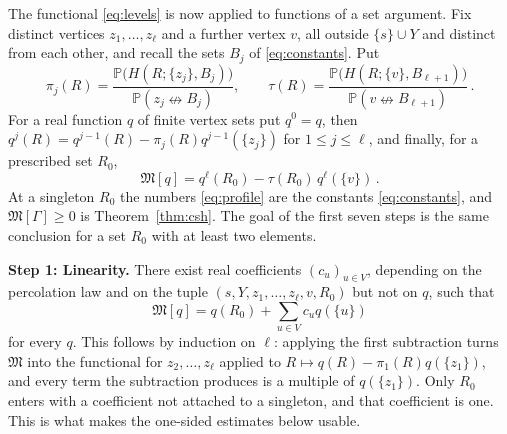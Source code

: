 \documentclass[11pt]{article}
\theoremstyle{definition}
\theoremstyle{remark}
\newcommand{\PP}{\mathbb P}
\newcommand{\ncon}{\nleftrightarrow}
\newcommand{\Marg}{\mathfrak M}
\begin{document}
The functional \eqref{eq:levels} is now applied to functions of a set argument. Fix
distinct vertices $z_1,\dots,z_\ell$ and a further vertex $v$, all outside $\{s\}\cup Y$
and distinct from each other, and recall the sets $B_j$ of \eqref{eq:constants}. Put
\begin{equation}\label{eq:profile}
 \pi_j(R)=\frac{\PP\bigl(H(R;\{z_j\},B_j)\bigr)}{\PP(z_j\ncon B_j)},\qquad
 \tau(R)=\frac{\PP\bigl(H(R;\{v\},B_{\ell+1})\bigr)}{\PP(v\ncon B_{\ell+1})}\,.
\end{equation}
For a real function $q$ of finite vertex sets put $q^0=q$, then
$q^j(R)=q^{j-1}(R)-\pi_j(R)q^{j-1}(\{z_j\})$ for $1\leq j\leq\ell$, and finally, for a
prescribed set $R_0$,
\begin{equation}\label{eq:margin}
 \Marg[q]=q^\ell(R_0)-\tau(R_0)\,q^\ell(\{v\})\,.
\end{equation}
At a singleton $R_0$ the numbers \eqref{eq:profile} are the constants
\eqref{eq:constants}, and $\Marg[\Gamma]\geq0$ is Theorem~\ref{thm:csh}. The goal of the
first seven steps is the same conclusion for a set $R_0$ with at least two elements.

\medskip\noindent\textbf{Step 1: Linearity.}
There exist real coefficients $(c_u)_{u\in V}$, depending on the percolation law and on the
tuple $(s,Y,z_1,\dots,z_\ell,v,R_0)$ but not on $q$, such that
\[
 \Marg[q]=q(R_0)+\sum_{u\in V}c_uq(\{u\})
\]
for every $q$. This follows by induction on $\ell$: applying the
first subtraction turns $\Marg$ into the functional for $z_2,\dots,z_\ell$ applied to
$R\mapsto q(R)-\pi_1(R)q(\{z_1\})$, and every term the subtraction produces is a multiple
of $q(\{z_1\})$. Only $R_0$ enters with a coefficient not attached to a singleton, and that
coefficient is one. This is what makes the one-sided estimates below usable.
\end{document}
